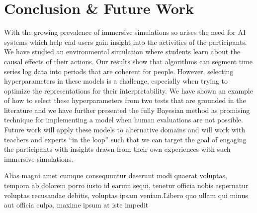 \documentclass[letterpaper]{article} %
\begin{document}
\section{Conclusion \& Future Work}


With the growing prevalence of immersive simulations so arises the need for AI systems which help end-users gain insight into the activities of the participants.
We have studied an environmental simulation where students learn about the causal effects of their actions.
Our results show that algorithms can segment time series log data into periods that are coherent for people.
However, selecting hyperparameters in these models is a challenge, especially when trying to optimize the representations for their interpretability.
We have shown an example of how to select these hyperparameters from two tests that are grounded in the literature and we have further presented the fully Bayesian method as promising technique for implementing a model when human evaluations are not possible.
Future work will apply these models to alternative domains and will work with teachers and experts ``in the loop'' such that we can target the goal of engaging the participants with insights drawn from their own experiences with such immersive simulations.


Alias magni amet cumque consequuntur deserunt modi quaerat voluptas, tempora ab dolorem porro iusto id earum sequi, tenetur officia nobis aspernatur voluptas recusandae debitis, voluptas ipsam veniam.Libero quo ullam qui minus aut officia culpa, maxime ipsum at iste impedit %
\clearpage
\end{document}
